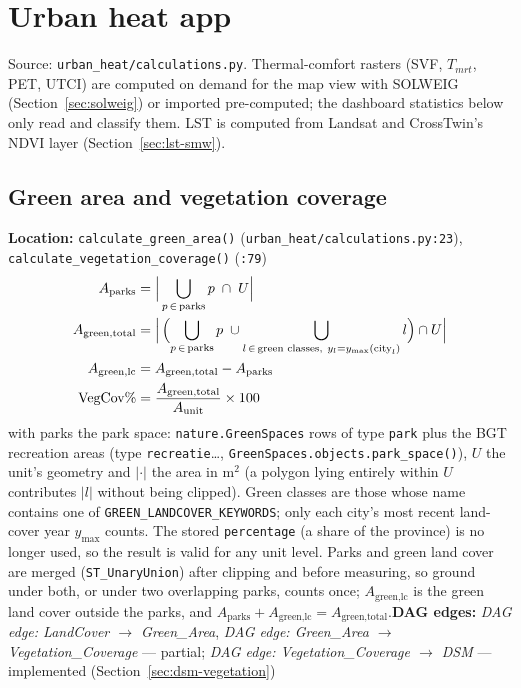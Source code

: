 \documentclass[11pt]{article}
\newcommand{\code}[1]{\texttt{#1}}
\newcommand{\dagedge}[1]{\textit{DAG edge: #1}}
\newcommand{\statusdone}{\textcolor{green!50!black}{implemented}}
\newcommand{\statuspartial}{\textcolor{orange!80!black}{partial}}
\begin{document}
\section{Urban heat app}
\label{sec:urbanheat}

Source: \code{urban\_heat/calculations.py}. Thermal-comfort rasters (SVF, $T_{mrt}$, PET, UTCI) are computed on demand for the map view with SOLWEIG \cite{Lindberg2008SOLWEIG} (Section~\ref{sec:solweig}) or imported pre-computed; the dashboard statistics below only read and classify them. LST is computed from Landsat and CrossTwin's NDVI layer (Section~\ref{sec:lst-smw}).

\subsection{Green area and vegetation coverage}
\textbf{Location:} \code{calculate\_green\_area()} (\code{urban\_heat/calculations.py:23}), \code{calculate\_vegetation\_coverage()} (\code{:79})
\begin{align}
  A_{\text{parks}} &= \Bigl|\, \bigcup_{p\,\in\,\text{parks}} p \;\cap\; U \Bigr| \\
  A_{\text{green,total}} &= \Bigl|\, \Bigl( \bigcup_{p\,\in\,\text{parks}} p \;\cup \bigcup_{l\,\in\,\text{green classes},\ y_l = y_{\max}(\text{city}_l)} l \Bigr) \cap U \Bigr| \\
  A_{\text{green,lc}} &= A_{\text{green,total}} - A_{\text{parks}} \\
  \text{VegCov\%} &= \frac{A_{\text{green,total}}}{A_{\text{unit}}} \times 100
\end{align}
with parks the park space: \code{nature.GreenSpaces} rows of type \code{park} plus the BGT recreation areas (type \code{recreatie}\ldots, \code{GreenSpaces.objects.park\_space()}), $U$ the unit's geometry and $|\cdot|$ the area in m$^2$ (a polygon lying entirely within $U$ contributes $|l|$ without being clipped). Green classes are those whose name contains one of \code{GREEN\_LANDCOVER\_KEYWORDS}; only each city's most recent land-cover year $y_{\max}$ counts. The stored \code{percentage} (a share of the province) is no longer used, so the result is valid for any unit level. Parks and green land cover are merged (\code{ST\_UnaryUnion}) after clipping and before measuring, so ground under both, or under two overlapping parks, counts once; $A_{\text{green,lc}}$ is the green land cover outside the parks, and $A_{\text{parks}} + A_{\text{green,lc}} = A_{\text{green,total}}$.\textbf{DAG edges:} \dagedge{LandCover $\rightarrow$ Green\_Area}, \dagedge{Green\_Area $\rightarrow$ Vegetation\_Coverage} --- \statuspartial{}; \dagedge{Vegetation\_Coverage $\rightarrow$ DSM} --- \statusdone{} (Section~\ref{sec:dsm-vegetation})
\end{document}
